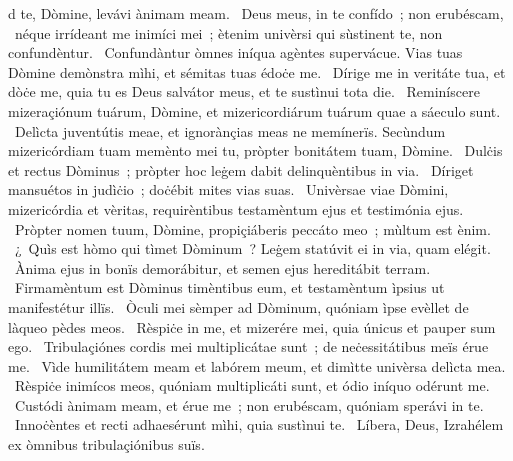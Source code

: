 \psalmChapterWithInscription{}
{ }
{%
d te, Dòmine, levávi ànimam meam. 
~Deus meus, in te confído~; non erubéscam, 
~néque irrídeant me inimíci mei~; ètenim univèrsi qui sùstinent te, non confundèntur. 
~Confundàntur òmnes iníqua agèntes supervácue. Vias tuas Dòmine demònstra mìhi, et sémitas tuas édoċe me. 
~Dírige me in veritáte tua, et dòċe me, quia tu es Deus salvátor meus, et te sustìnui tota die. 
~Reminíscere mizeraçiónum tuárum, Dòmine, et mizericordiárum tuárum quae a sáeculo sunt. 
~Delìcta juventútis meae, et ignorànçias meas ne memínerïs. Secùndum mizericórdiam tuam memènto mei tu, pròpter bonitátem tuam, Dòmine. 
~Dulċis et rectus Dòminus~; pròpter hoc leġem dabit delinquèntibus in via. 
~Díriget mansuétos in judìċio~; doċébit mites vias suas. 
~Univèrsae viae Dòmini, mizericórdia et vèritas, requirèntibus testamèntum ejus et testimónia ejus. 
~Pròpter nomen tuum, Dòmine, propiçiáberis peccáto meo~; mùltum est ènim. 
~¿~Quìs est hòmo qui tìmet Dòminum~? Leġem statúvit ei in via, quam elégit. 
~Ànima ejus in bonïs demorábitur, et semen ejus hereditábit terram. 
~Firmamèntum est Dòminus timèntibus eum, et testamèntum ìpsius ut manifestétur illïs. 
~Òculi mei sèmper ad Dòminum, quóniam ìpse evèllet de làqueo pèdes meos. 
~Rèspiċe in me, et mizerére mei, quia únicus et pauper sum ego. 
~Tribulaçiónes cordis mei multiplicátae sunt~; de neċessitátibus meïs érue me. 
~Vìde humilitátem meam et labórem meum, et dimìtte univèrsa delìcta mea. 
~Rèspiċe inimícos meos, quóniam multiplicáti sunt, et ódio iníquo odérunt me. 
~Custódi ànimam meam, et érue me~; non erubéscam, quóniam sperávi in te. 
~Innoċèntes et recti adhaesérunt mìhi, quia sustìnui te. 
~Líbera, Deus, Izrahélem ex òmnibus tribulaçiónibus suïs. 
}
